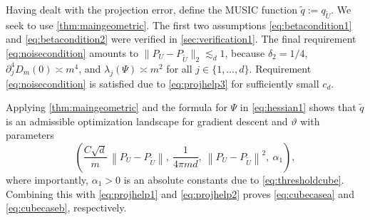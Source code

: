 \documentclass[11pt]{article}
\theoremstyle{definition}
\numberwithin{theorem}{section}
\numberwithin{lemma}{section}
\numberwithin{equation}{section}
\renewcommand{\tilde}{\widetilde}
\newcommand{\norm}[1]{{\left\|#1\right\|}}
\numberwithin{equation}{section}
\begin{document}
	Having dealt with the projection error, define the MUSIC function $\tilde q:=q_{\tilde U}$. We seek to use \cref{thm:maingeometric}. The first two assumptions \eqref{eq:betacondition1} and \eqref{eq:betacondition2} were verified in \cref{sec:verification1}. The final requirement \eqref{eq:noisecondition} amounts to $\|P_U-P_{\tilde U}\|_2\lesssim_d 1$, because $\delta_2=1/4$, $\partial_j^4 D_m(0)\asymp m^4$, and $\lambda_j(\Psi)\asymp m^2$ for all $j\in \{1,\dots,d\}$. Requirement \eqref{eq:noisecondition} is satisfied due to \eqref{eq:projhelp3} for sufficiently small $c_d$. 
	
	Applying \cref{thm:maingeometric} and the formula for $\Psi$ in \eqref{eq:hessian1} shows that $\tilde q$ is an admissible optimization landscape for gradient descent and $\vartheta$ with parameters
	$$
	\left( \frac{C\sqrt d}{m} \, \norm{P_U-P_{\tilde U}}, \
	\frac{1}{4\pi m d}, \
	\norm{P_U-P_{\tilde U}}^2, \ \alpha_1 \right),
	$$
	where importantly, $\alpha_1>0$ is an absolute constants due to \eqref{eq:thresholdcube}. Combining this with \eqref{eq:projhelp1} and \eqref{eq:projhelp2} proves \eqref{eq:cubecasea} and \eqref{eq:cubecaseb}, respectively. 
	
\end{document}

